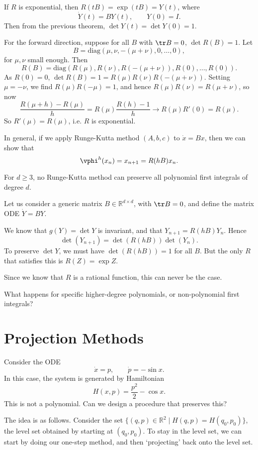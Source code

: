 \documentclass[12pt]{article}
\begin{document}
\begin{proofbox}
	If $R$ is exponential, then $R(tB) = \exp(tB) = Y(t)$, where
	\[
	\dot Y(t) = B Y(t), \qquad Y(0) = I.
	\]
	Then from the previous theorem, $\det Y(t) = \det Y(0) = 1$.

	For the forward direction, suppose for all $B$ with $\tr B = 0$, $\det R(B) = 1$. Let
	\[
	B = \mathrm{diag}(\mu, \nu, -(\mu + \nu), 0, \ldots, 0),
	\]
	for $\mu, \nu$ small enough. Then
	\[
	R(B) = \mathrm{diag} (R(\mu), R(\nu), R(-(\mu+\nu)), R(0), \ldots, R(0)).
	\]
	As $R(0) = 0$, $\det R(B) = 1 = R(\mu) R(\nu) R(-(\mu+\nu))$. Setting $\mu = -\nu$, we find $R(\mu) R(-\mu) = 1$, and hence $R(\mu)R(\nu) = R(\mu + \nu)$, so now
	\[
	\frac{R(\mu + h) - R(\mu)}{h} = R(\mu) \frac{R(h) - 1}{h} \to R(\mu) R'(0) = R(\mu).
	\]
	So $R'(\mu) = R(\mu)$, i.e. $R$ is exponential.
\end{proofbox}


In general, if we apply Runge-Kutta method $(A, b, c)$ to $\dot x = B x$, then we can show that
\[
\vphi^{h}(x_n) = x_{n+1} = R(h B)x_n.
\]

\begin{theorem}
	For $d \geq 3$, no Runge-Kutta method can preserve all polynomial first integrals of degree $d$.
\end{theorem}

\begin{proofbox}
	Let us consider a generic matrix $B \in \mathbb{R}^{d \times d}$, with $\tr B = 0$, and define the matrix ODE $\dot Y = B Y$.

	We know that $g(Y) = \det Y$ is invariant, and that $Y_{n+1} = R(h B) Y_n$. Hence
	\[
	\det (Y_{n+1}) = \det (R (hB)) \det (Y_n).
	\]
	To preserve $\det Y$, we must have $\det(R(hB)) = 1$ for all $B$. But the only $R$ that satisfies this is $R(Z) = \exp Z$.

	Since we know that $R$ is a rational function, this can never be the case.
\end{proofbox}

What happens for specific higher-degree polynomials, or non-polynomial first integrals?

\newpage

\section{Projection Methods}%
\label{sec:pm}

\begin{exbox}
	Consider the ODE
	\[
	\dot x = p, \qquad \dot p =- \sin x.
	\]
	In this case, the system is generated by Hamiltonian
	\[
	H(x, p) = \frac{p^2}{2} - \cos x.
	\]
	This is not a polynomial. Can we design a procedure that preserves this?

	The idea is as follows. Consider the set $\{(q, p) \in \mathbb{R}^2 \mid H(q, p) = H(q_0, p_0)\}$, the level set obtained by starting at $(q_0, p_0)$. To stay in the level set, we can start by doing our one-step method, and then `projecting' back onto the level set.
\end{exbox}
\end{document}
